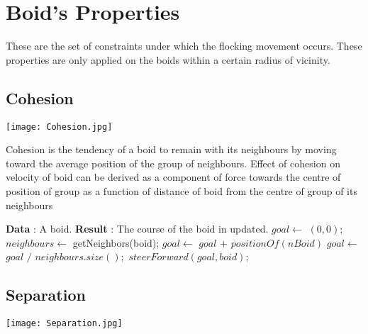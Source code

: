 \documentclass{article}
\begin{document}

\section{Boid's Properties}
These are the set of constraints under which the flocking movement occurs. These properties are only applied on the boids within a certain radius of vicinity.

\subsection{Cohesion}

\vspace{3mm}
\begin{center}
\texttt{[image: Cohesion.jpg]}
\end{center}

\vspace{3mm}
Cohesion is the tendency of a boid to remain with its neighbours by moving toward the average position of the group of neighbours.
Effect of cohesion on velocity of boid can be derived as a component of force towards the centre of position of group as a function of distance of boid from the centre of group of its neighbours

\begin{algorithm}
\begin{algorithmic}
\State \textbf{Data} : A boid.
\State \textbf{Result} : The course of the boid in updated.
 \State $goal \gets$ $(0,0);$
 \State $neighbours\gets$ getNeighbors(boid);
         \State $goal \gets$ $goal$ $+$ $positionOf(nBoid)$   
        \EndFor 
           \State $goal \gets$ $goal$ $/$ $neighbours.size();$
              \State $steerForward(goal, boid);$ 
\end{algorithmic}
\end{algorithm}

\subsection{Separation}

\vspace{3mm}
\begin{center}
\texttt{[image: Separation.jpg]}
\end{center}
\end{document}
